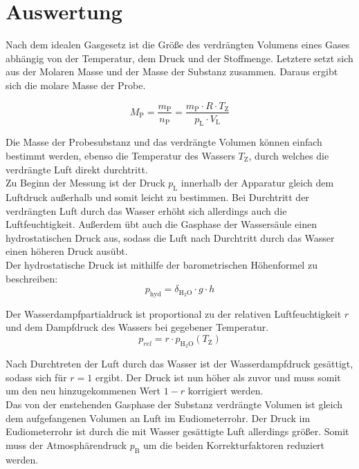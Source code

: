 \documentclass[12pt,a4paper,titlepage,headinclude,bibtotoc]{scrartcl}
\begin{document}
\section{Auswertung}

Nach dem idealen Gasgesetz ist die Größe des verdrängten Volumens eines Gases abhängig von der Temperatur, dem Druck und der Stoffmenge. Letztere setzt sich aus der Molaren Masse und der Masse der Substanz zusammen. Daraus ergibt sich die molare Masse der Probe.

\begin{equation}
M_\mathrm{P} = \frac{m_\mathrm{P}}{n_\mathrm{P}} =\frac{m_\mathrm{P} \cdot R \cdot T_\mathrm{Z}}{p_\mathrm{L} \cdot V_\mathrm{L}}
\end{equation}

Die Masse der Probesubstanz und das verdrängte Volumen können einfach bestimmt werden, ebenso die Temperatur des Wassers $T_\mathrm{Z}$, durch welches die verdrängte Luft direkt durchtritt. \\
Zu Beginn der Messung ist der Druck $p_\mathrm{L}$ innerhalb der Apparatur gleich dem Luftdruck außerhalb und somit leicht zu bestimmen. Bei Durchtritt der verdrängten Luft durch das Wasser erhöht sich allerdings auch die Luftfeuchtigkeit. Außerdem übt auch die Gasphase der Wassersäule einen hydrostatischen Druck aus, sodass die Luft nach Durchtritt durch das Wasser einen höheren Druck ausübt. \\
Der hydrostatische Druck ist mithilfe der barometrischen Höhenformel zu beschreiben:\\

\begin{equation}
p_\mathrm{hyd}= \delta_\mathrm{H_2O} \cdot g \cdot h
\end{equation}

Der Wasserdampfpartialdruck ist proportional zu der relativen Luftfeuchtigkeit $r$ und dem Dampfdruck des Wassers bei gegebener Temperatur. \\

\begin{equation}
p_{rel} = r\cdot p_\mathrm{H_2O}(T_\mathrm{Z})
\end{equation}

Nach Durchtreten der Luft durch das Wasser ist der Wasserdampfdruck gesättigt, sodass sich für $r = 1$ ergibt. Der Druck ist nun höher als zuvor und muss somit um den neu hinzugekommenen Wert $1- r$ korrigiert werden. \\
Das von der enstehenden Gasphase der Substanz verdrängte Volumen ist gleich dem aufgefangenen Volumen an Luft im Eudiometerrohr. Der Druck im Eudiometerrohr ist durch die mit Wasser gesättigte Luft allerdings größer. Somit muss der Atmosphärendruck $p_\mathrm{B}$ um die beiden Korrekturfaktoren reduziert werden. 
\end{document}
